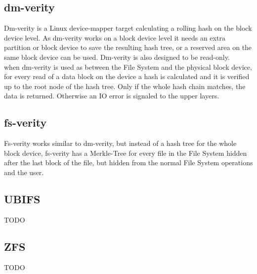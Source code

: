 \documentclass[10pt]{article}
\begin{document}
\subsection{dm-verity}
Dm-verity is a Linux device-mapper target calculating a rolling hash on the
block device level. As dm-verity works on a block device level it needs an
extra partition or block device to save the resulting hash tree, or a reserved
area on the same block device can be used. Dm-verity is also designed to be
read-only.\\
when dm-verity is used as between the File System and the physical block
device, for every read of a data block on the device a hash is calculated and
it is verified up to the root node of the hash tree. Only if the whole hash
chain matches, the data is returned. Otherwise an IO error is signaled to the
upper layers.

\subsection{fs-verity}
Fs-verity works similar to dm-verity, but instead of a hash tree for the whole
block device, fs-verity has a Merkle-Tree for every file in the File System
hidden after the last block of the file, but hidden from the normal
File System operations and the user.

\subsection{UBIFS}
TODO

\subsection{ZFS}
TODO
\end{document}
